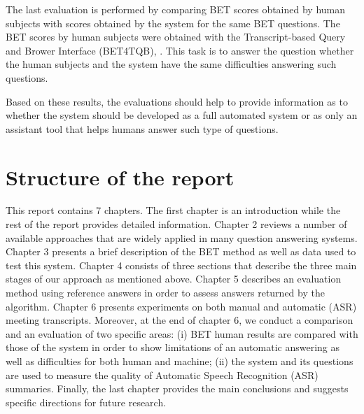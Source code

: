The last evaluation is performed by comparing BET scores obtained by human subjects with scores obtained by the system for the same BET questions. The BET scores by human subjects were obtained with the Transcript-based Query and Brower Interface (BET4TQB)\cite{popescubelis2007otm}, . This task is to answer the question whether the human subjects and the system have the same difficulties answering such questions.   

Based on these results, the evaluations should help to provide information as to whether the system should be developed as a full automated system or as only an assistant tool that helps humans answer such type of questions.

\section{Structure of the report}
This report contains 7 chapters. The first chapter is an introduction while the rest of the report provides detailed information. Chapter 2 reviews a number of available approaches that are widely applied in many question answering systems. Chapter 3 presents a brief description of the BET method as well as data used to test this system. Chapter 4 consists of three sections that describe the three main stages of our approach as mentioned above. Chapter 5 describes an evaluation method using reference answers in order to assess answers returned by the algorithm. Chapter 6 presents experiments on both manual and automatic (ASR) meeting transcripts. Moreover, at the end of chapter 6, we conduct a comparison and an evaluation of two specific areas: (i) BET human results are compared with those of the system in order to show limitations of an automatic answering as well as difficulties for both human and machine; (ii) the system and its questions are used to measure the quality of Automatic Speech Recognition (ASR) summaries. Finally, the last chapter provides the main conclusions and suggests specific directions for future research.
